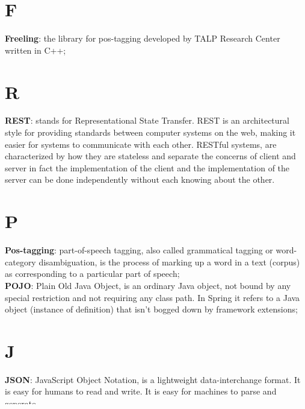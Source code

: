 
\section*{F}
\textbf{Freeling}: the library for pos-tagging developed by TALP Research Center written in C++;
\section*{R}
\textbf{REST}: stands for Representational State Transfer. REST is an architectural style for providing standards between computer systems on the web, making it easier for systems to communicate with each other. RESTful systems, are characterized by how they are stateless and separate the concerns of client and server in fact the implementation of the client and the implementation of the server can be done independently without each knowing about the other.
\section*{P}
\textbf{Pos-tagging}: part-of-speech tagging, also called grammatical tagging or word-category disambiguation, is the process of marking up a word in a text (corpus) as corresponding to a particular part of speech; \\ 
\textbf{POJO}: Plain Old Java Object, is an ordinary Java object, not bound by any special restriction and not requiring any class path. In Spring it refers to a Java object (instance of definition) that isn't bogged down by framework extensions;
\section*{J}
\textbf{JSON}: JavaScript Object Notation, is a lightweight data-interchange format.  It is easy for humans to read and write. It is easy for machines to parse and generate.\\
\textbf{JWT}: JSON Web Token, a JSON-based open standard (RFC 7519) for creating access tokens that assert some number of claims;
